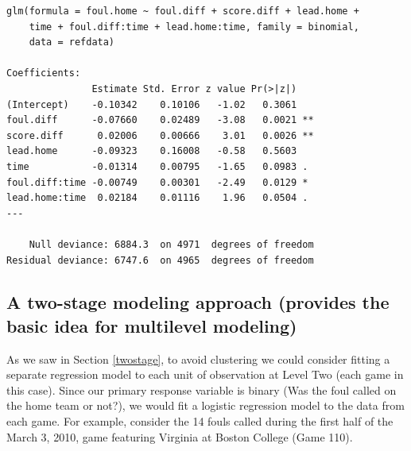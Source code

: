 \documentclass[
]{krantz}
\begin{document}
\begin{verbatim}
glm(formula = foul.home ~ foul.diff + score.diff + lead.home + 
    time + foul.diff:time + lead.home:time, family = binomial, 
    data = refdata)

Coefficients:
               Estimate Std. Error z value Pr(>|z|)   
(Intercept)    -0.10342    0.10106   -1.02   0.3061   
foul.diff      -0.07660    0.02489   -3.08   0.0021 **
score.diff      0.02006    0.00666    3.01   0.0026 **
lead.home      -0.09323    0.16008   -0.58   0.5603   
time           -0.01314    0.00795   -1.65   0.0983 . 
foul.diff:time -0.00749    0.00301   -2.49   0.0129 * 
lead.home:time  0.02184    0.01116    1.96   0.0504 . 
---

    Null deviance: 6884.3  on 4971  degrees of freedom
Residual deviance: 6747.6  on 4965  degrees of freedom
\end{verbatim}

\hypertarget{twostage-glmm}{%
\subsection{A two-stage modeling approach (provides the basic idea for multilevel modeling)}\label{twostage-glmm}}

As we saw in Section \ref{twostage}, to avoid clustering we could consider fitting a separate regression model to each unit of observation at Level Two (each game in this case). Since our primary response variable is binary (Was the foul called on the home team or not?), we would fit a logistic regression model to the data from each game. For example, consider the 14 fouls called during the first half of the March 3, 2010, game featuring Virginia at Boston College (Game 110).
\end{document}
